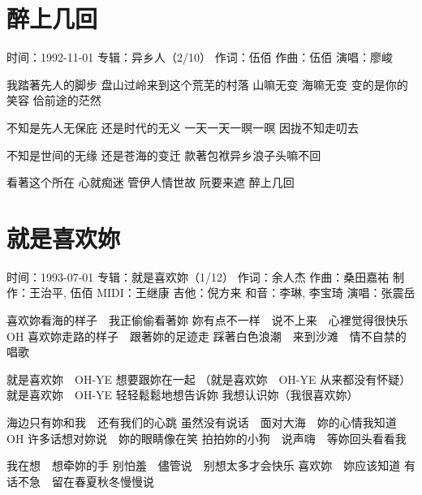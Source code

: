 \documentclass[UTF8,a4paper,oneside,twocolumn,12pt]{ctexbook}
\newcommand{\infopair}[2]{\textbullet #1：#2}
\newcommand{\zc}[1][伍佰]{\infopair{作词}{#1}}
\newcommand{\zq}[1][伍佰]{\infopair{作曲}{#1}}
\newcommand{\zj}[1]{\infopair{专辑}{#1}}
\newcommand{\zz}[1]{\infopair{制作}{#1}}
\newcommand{\sj}[1]{\infopair{时间}{#1}}
\newenvironment{info}{\begin{flushleft}\kaishu
	}
	{\end{flushleft}\normalsize\yahei\par}
\newenvironment{lyric}{
	}
{}
\begin{document}
\section{醉上几回}
\begin{info}
	\sj{1992-11-01}
	\zj{异乡人（2/10）}
	\zc
	\zq
	\infopair{演唱}{廖峻}
\end{info}
\begin{lyric}
	我踏著先人的脚步
	盘山过岭来到这个荒芜的村落
	山嘛无变
	海嘛无变
	变的是你的笑容
	佮前途的茫然

	不知是先人无保庇
	还是时代的无义
	一天一天一暝一暝
	因拢不知走叨去

	不知是世间的无缘
	还是苍海的变迁
	款著包袱异乡浪子头嘛不回

	看著这个所在
	心就痴迷
	管伊人情世故
	阮要来遮
	醉上几回
\end{lyric}

\section{就是喜欢妳}
\begin{info}
	\sj{1993-07-01}
	\zj{就是喜欢妳（1/12）}
	\zc[余人杰]
	\zq[桑田嘉祐]
	\zz{王治平, 伍佰}
	\infopair{MIDI}{王继康}
	\infopair{吉他}{倪方来}
	\infopair{和音}{李琳, 李宝琦}
	\infopair{演唱}{张震岳}
\end{info}
\begin{lyric}
	喜欢妳看海的样子　我正偷偷看著妳
	妳有点不一样　说不上来　心裡觉得很快乐 OH
	喜欢妳走路的样子　跟著妳的足迹走
	踩著白色浪潮　来到沙滩　情不自禁的唱歌

	就是喜欢妳　OH-YE 想要跟妳在一起
	（就是喜欢妳　OH-YE 从来都没有怀疑）
	就是喜欢妳　OH-YE 轻轻鬆鬆地想告诉妳
	我想认识妳（我很喜欢妳）

	海边只有妳和我　还有我们的心跳
	虽然没有说话　面对大海　妳的心情我知道　OH
	许多话想对妳说　妳的眼睛像在笑
	拍拍妳的小狗　说声嗨　等妳回头看看我

	我在想　想牵妳的手
	别怕羞　儘管说　别想太多才会快乐
	喜欢妳　妳应该知道
	有话不急　留在春夏秋冬慢慢说
\end{lyric}
\end{document}
